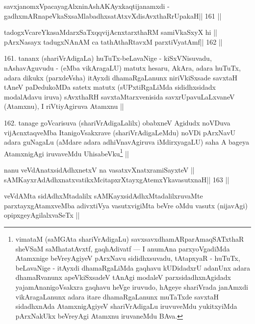 
\begin{shl}
savxjanomxVpacayagAlxninAshAKAyxkaqtijanamxdi -
gadhxmARnapeVkaSxsaMlabadhxsatAtxvXdisAvxthaRrUpakaH\hfill || 161 ||
\end{shl}

\begin{shl}
tadogxVcareYkasaMdarxSaTxqqvijAcnxtarxthaRM samiVkaSxyX hi ||
pArxNasayx tadugxNAnAM ca tathAthaRtavxM parxtiVyatAmf\hfill || 162 ||
\end{shl}

\begin{artha}
161. tananx (shariVrAdigaLa) huTuTx-beLavaNige - kiSxVNisuvadu, 
nAshavAguvudu - (eMba vikAragaLU) matutx hesaru, AkAra, adara huTuTx, adara dikukx (parxdeVsha) itAyxdi dhamaRgaLanunx niriVkiSxsade savxtaH tAneV paDedukoMDa satetx  matutx (sUPxtiRgaLiMda sididhxsidadx modalAdavu iruva) sAvxthaRH savxtaMtarxvenisida savxrUpavuLaLxvaneV (Atamxnu), I riVtiyAgiruva Atamxnu ||
\end{artha}

\begin{artha}
162. tanage goVcarisuva (shariVrAdigaLalilx) obabxneV Agidudx noVDuva 
vijAcnxtaqveMba ItanigoVsakxrave (shariVrAdigaLeMdu) noVDi pArxNavU adara guNagaLu (aMdare adara adhiVnavAgiruva iMdirxyagaLU) saha A bageya AtamxnigAgi iruvaveMdu UhisabeVku\footnote[9]{vimataM (saMGAta shariVrAdigaLu) savxsavxdhamARparAmaqSATxthaR sheVSaM saMhatatAvxtf, gaqhAdivatf --- I anumAna parxyoVgadiMda Atamxnige beVreyAgiyeV pArxNavu sididhxsuvadu, tAtapxyaR - huTuTx, beLavaNige - itAyxdi dhamaRgaLiMda gaqhavu kUDidadxrU adanUnx adara dhamaRvanunx apeVkiSxsadeV tAnAgi modaleV parxsidadhxnAgidadx yajamAnanigoVsakxra gaqhavu heVge iruvudo, hAgeye shariVrada janAmxdi vikAragaLanunx adara itare dhamaRgaLanunx muTaTxde savxtaH sidadhxnAda AtamxnigAgiyeV shariVrAdigaLu iruvuveMdu yukitxyiMda pArxNakUkx beVreyAgi Atamxnu iruvaneMdu BAva.} ||
\end{artha}


\begin{shl}
nanu veVdAnatxsidAdhxnetxV na vasatxvXnatxramiSayxteV ||
sAMKayxrAdAdhxnatxvatikxMcitapxrXtayxgAtemxYkavasutxnaH\hfill || 163 ||
\end{shl}

\begin{artha}
veVdAMta sidAdhxMtadalilx sAMKayxsidAdhxMtadalilxruvaMte 
parxtayxgAtamxveMba adivxtiVya vasutxvigiMta beVre oMdu vasutx (nijavAgi) opipxgeyAgilalxvaSeTx ||
\end{artha}

